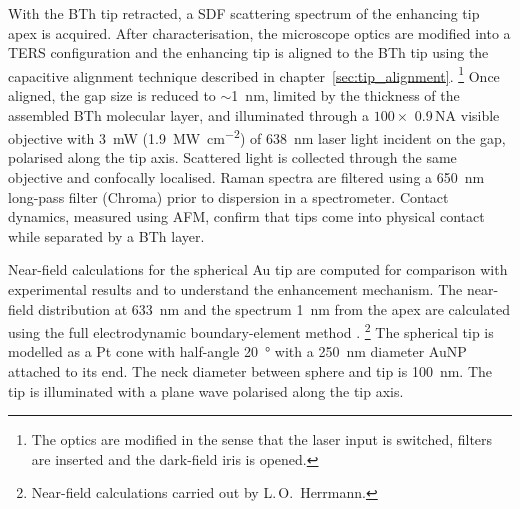 \documentclass{article}
\begin{document}
With the BTh tip retracted, a SDF scattering spectrum of the enhancing tip apex is acquired. After characterisation, the microscope optics are modified into a TERS configuration and the enhancing tip is aligned to the BTh tip using the capacitive alignment technique described in chapter~\ref{sec:tip_alignment}.%
\footnote{The optics are modified in the sense that the laser input is switched, filters are inserted and the dark-field iris is opened.}
Once aligned, the gap size is reduced to $\sim$\SI{1}{nm}, limited by the thickness of the assembled BTh molecular layer, and illuminated through a $100\times$ 0.9\,NA visible objective with \SI{3}{mW} (\SI{1.9}{\mega\watt\per\centi\metre\squared}) of \SI{638}{nm} laser light incident on the gap, polarised along the tip axis. Scattered light is collected through the same objective and confocally localised. Raman spectra are filtered using a \SI{650}{nm} long-pass filter (Chroma) prior to dispersion in a spectrometer. Contact dynamics, measured using AFM, confirm that tips come into physical contact while separated by a BTh layer.

Near-field calculations for the spherical Au tip are computed for comparison with experimental results and to understand the enhancement mechanism. The near-field distribution at \SI{633}{nm} and the spectrum \SI{1}{nm} from the apex are calculated using the full electrodynamic boundary-element method \cite{deabajo1997, deabajo2002}.%
\footnote{Near-field calculations carried out by L.\,O.\ Herrmann.}
The spherical tip is modelled as a Pt cone with half-angle \SI{20}{\degree} with a \SI{250}{nm} diameter AuNP attached to its end. The neck diameter between sphere and tip is \SI{100}{nm}. The tip is illuminated with a plane wave polarised along the tip axis.
\end{document}
